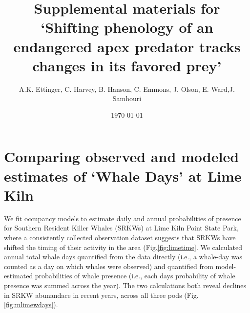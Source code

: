 \documentclass{article}
\begin{document}



\title{Supplemental materials for `Shifting phenology of an endangered apex predator tracks changes in its favored prey'}
\date{\today}
\maketitle
\author{A.K. Ettinger, C. Harvey, B. Hanson, C. Emmons, J. Olson, E. Ward,J. Samhouri}
\renewcommand{\thetable}{S\arabic{table}}
\renewcommand{\thefigure}{S\arabic{figure}}

\section* {Comparing observed and modeled estimates of `Whale Days' at Lime Kiln}
\par We fit occupancy models to estimate daily and annual probabilities of presence for Southern Resident Killer Whales (SRKWs) at Lime Kiln Point State Park, where a consistently collected observation dataset suggests that SRKWs have shifted the timing of their activity in the area (Fig.\ref{fig:limetime}. We calculated annual total whale days quantified from the data directly (i.e., a whale-day was counted as a day on which whales were observed) and quantified from model-estimated probabilities of whale presence (i.e., each days probability of whale presence was summed across the year). The two calculations both reveal declines in SRKW abunandace in recent years, across all three pods (Fig. \ref{fig:mlimewdays}). 
\end{document}
